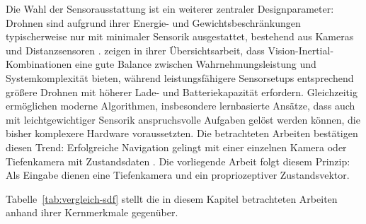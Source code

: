 Die Wahl der Sensorausstattung ist ein weiterer zentraler Designparameter: Drohnen sind aufgrund ihrer Energie- und Gewichtsbeschränkungen typischerweise nur mit minimaler Sensorik ausgestattet, bestehend aus Kameras und Distanzsensoren \autocite{bartolomeiAutonomousEmergencyLanding2022}. \textcite{semerikovVisionBasedAutonomousUAV2025} zeigen in ihrer Übersichtsarbeit, dass Vision-Inertial-Kombinationen eine gute Balance zwischen Wahrnehmungsleistung und Systemkomplexität bieten, während leistungsfähigere Sensorsetups entsprechend größere Drohnen mit höherer Lade- und Batteriekapazität erfordern. Gleichzeitig ermöglichen moderne Algorithmen, insbesondere lernbasierte Ansätze, dass auch mit leichtgewichtiger Sensorik anspruchsvolle Aufgaben gelöst werden können, die bisher komplexere Hardware voraussetzten. Die betrachteten Arbeiten bestätigen diesen Trend: Erfolgreiche Navigation gelingt mit einer einzelnen Kamera \autocite{kimMonocularVisionbasedAutonomous2022, polvaraSimtoRealQuadrotorLanding2020, bartolomeiAutonomousEmergencyLanding2022} oder Tiefenkamera mit Zustandsdaten \autocite{loquercioLearningHighspeedFlight2021, xuNavRLLearningSafe2024}. Die vorliegende Arbeit folgt diesem Prinzip: Als Eingabe dienen eine Tiefenkamera und ein propriozeptiver Zustandsvektor.

Tabelle~\ref{tab:vergleich-sdf} stellt die in diesem Kapitel betrachteten Arbeiten anhand ihrer Kernmerkmale gegenüber.

